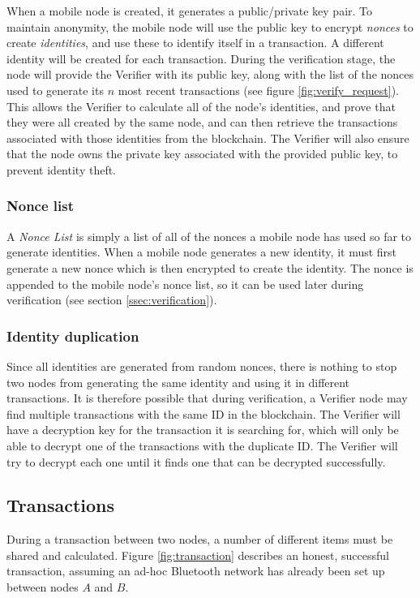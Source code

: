 When a mobile node is created, it generates a public/private key pair. To maintain anonymity, the mobile node will use the public key to encrypt \textit{nonces} to create \textit{identities}, and use these to identify itself in a transaction. A different identity will be created for each transaction. During the verification stage, the node will provide the Verifier with its public key, along with the list of the nonces used to generate its $n$ most recent transactions (see figure \ref{fig:verify_request}). This allows the Verifier to calculate all of the node's identities, and prove that they were all created by the same node, and can then retrieve the transactions associated with those identities from the blockchain. The Verifier will also ensure that the node owns the private key associated with the provided public key, to prevent identity theft.

\subsubsection{Nonce list} \label{sssec:nonce_list}
A \textit{Nonce List} is simply a list of all of the nonces a mobile node has used so far to generate identities. When a mobile node generates a new identity, it must first generate a new nonce which is then encrypted to create the identity. The nonce is appended to the mobile node's nonce list, so it can be used later during verification (see section \ref{ssec:verification}).

\subsubsection{Identity duplication}
Since all identities are generated from random nonces, there is nothing to stop two nodes from generating the same identity and using it in different transactions. It is therefore possible that during verification, a Verifier node may find multiple transactions with the same ID in the blockchain. The Verifier will have a decryption key for the transaction it is searching for, which will only be able to decrypt one of the transactions with the duplicate ID. The Verifier will try to decrypt each one until it finds one that can be decrypted successfully.

\newpage
\subsection{Transactions} \label{sec:transactions}
During a transaction between two nodes, a number of different items must be shared and calculated. Figure \ref{fig:transaction} describes an honest, successful transaction, assuming an ad-hoc Bluetooth network has already been set up between nodes $A$ and $B$.

